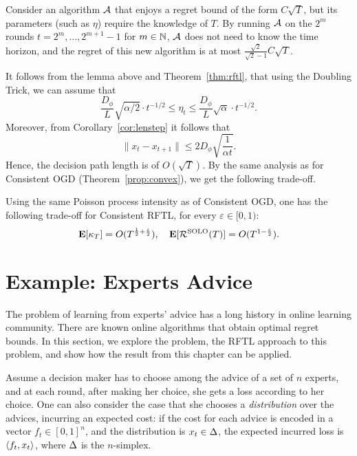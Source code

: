 \begin{lemma}
    Consider an algorithm $\mathcal{A}$ that enjoys a regret bound of the form $C\sqrt{T}$, but its parameters (such as $\eta$) require the knowledge of $T$. By running $\mathcal{A}$ on the $2^m$ rounds $t = 2^m,\ldots,2^{m+1} -1$ for $m\in \mathbb{N}$, $\mathcal{A}$ does not need to know the time horizon, and the regret of this new algorithm is at most $\frac{\sqrt{2}}{\sqrt{2} - 1}C\sqrt{T}$.
\end{lemma}

It follows from the lemma above and Theorem~\ref{thm:rftl}, that using the Doubling Trick, we can assume that 
\[
    \frac{D_\phi}{L} \sqrt{\alpha/2}\cdot t^{-1/2} \leq \eta_t \leq \frac{D_\phi}{L} \sqrt{\alpha} \cdot t^{-1/2}.
\]
Moreover, from Corollary~\ref{cor:lenstep} it follows that 
\[
    \|x_t - x_{t+1}\| \leq  2D_\phi \sqrt{\frac{1}{\alpha t}}.
\]
Hence, the decision path length is of $O(\sqrt{T})$. By the same analysis as for Consistent OGD (Theorem~\ref{prop:convex}), we get the following trade-off.
\begin{theorem}
    Using the same Poisson process intensity as of Consistent OGD, one has the following trade-off for Consistent RFTL, for every $\varepsilon \in [0, 1)$:
   \[
      \mathbf{E}[\kappa_T] = O(T^{\frac{1}{2}+\frac{\varepsilon}{2}}),\quad \mathbf{E}[\mathcal{R}^{\mathrm{SOLO}}(T)] = O(T^{1-\frac{\varepsilon}{2}}).
   \]
 
\end{theorem}

\section{Example: Experts Advice}\label{sec:experts}
The problem of learning from experts' advice has a long history in online learning community. There are known online algorithms that obtain optimal regret bounds. In this section, we explore the problem, the RFTL approach to this problem, and show how the result from this chapter can be applied.

Assume a decision maker has to choose among the advice of a set of $n$ experts, and at each round, after making her choice, she gets a loss according to her choice. One can also consider the case that she chooses a \emph{distribution} over the advices, incurring an expected cost: if the cost for each advice is encoded in a vector $f_t\in [0,1]^n$, and the distribution is $x_t\in\Delta$, the expected incurred loss is $\left\langle f_t,x_t \right\rangle$, where $\Delta$ is the $n$-simplex.

